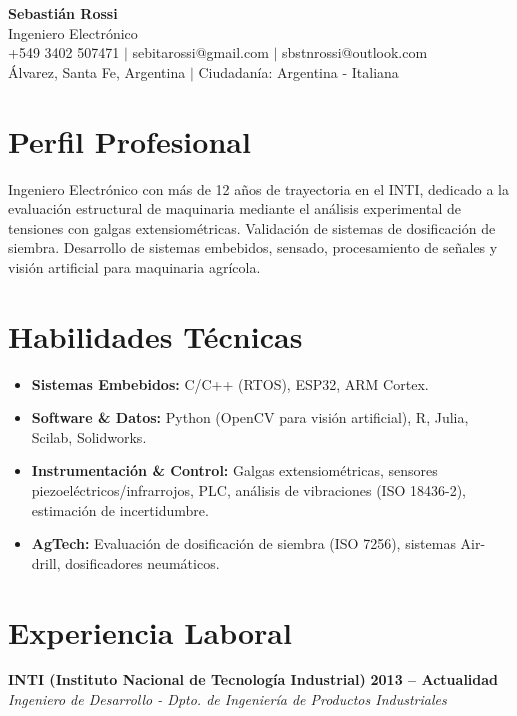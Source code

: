 \documentclass[11pt,a4paper]{article}
\begin{document}
\begin{center}
    {\Huge \textbf{Sebastián Rossi}} \\ \vspace{4pt}
    Ingeniero Electrónico  \\ \vspace{4pt}
    \small +549 3402 507471 $|$ sebitarossi@gmail.com $|$ sbstnrossi@outlook.com \\
    Álvarez, Santa Fe, Argentina $|$ Ciudadanía: Argentina - Italiana
\end{center}

\section{Perfil Profesional}
Ingeniero Electrónico con más de 12 años de trayectoria en el INTI, dedicado a la evaluación estructural de maquinaria mediante el análisis experimental de tensiones con galgas extensiométricas. Validación de sistemas de dosificación de siembra. Desarrollo de sistemas embebidos, sensado, procesamiento de señales y visión artificial para maquinaria agrícola.

\section{Habilidades Técnicas}
\begin{itemize}[leftmargin=0.5cm, noitemsep]
    \item \textbf{Sistemas Embebidos:} C/C++ (RTOS), ESP32, ARM Cortex.
    \item \textbf{Software \& Datos:} Python (OpenCV para visión artificial), R, Julia, Scilab, Solidworks.
    \item \textbf{Instrumentación \& Control:} Galgas extensiométricas, sensores piezoeléctricos/infrarrojos, PLC, análisis de vibraciones (ISO 18436-2), estimación de incertidumbre.
    \item \textbf{AgTech:} Evaluación de dosificación de siembra (ISO 7256), sistemas Air-drill, dosificadores neumáticos.
\end{itemize}

\section{Experiencia Laboral}

\textbf{INTI (Instituto Nacional de Tecnología Industrial)} \hfill \textbf{2013 -- Actualidad} \\
\textit{Ingeniero de Desarrollo - Dpto. de Ingeniería de Productos Industriales} 
\end{document}
